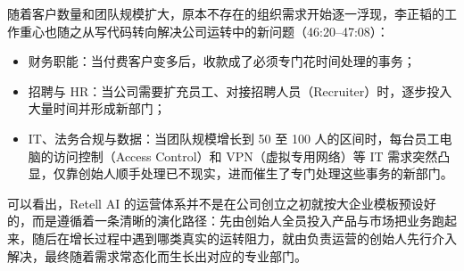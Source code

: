 \documentclass[UTF8,a4paper,11pt,fontset=fandol]{ctexart}
\begin{document}
随着客户数量和团队规模扩大，原本不存在的组织需求开始逐一浮现，李正韬的工作重心也随之从写代码转向解决公司运转中的新问题（46:20–47:08）：
\begin{itemize}
\item 财务职能：当付费客户变多后，收款成了必须专门花时间处理的事务；
\item 招聘与 HR：当公司需要扩充员工、对接招聘人员（Recruiter）时，逐步投入大量时间并形成新部门；
\item IT、法务合规与数据：当团队规模增长到 50 至 100 人的区间时，每台员工电脑的访问控制（Access Control）和 VPN（虚拟专用网络）等 IT 需求突然凸显，仅靠创始人顺手处理已不现实，进而催生了专门处理这些事务的新部门。
\end{itemize}

可以看出，Retell AI 的运营体系并不是在公司创立之初就按大企业模板预设好的，而是遵循着一条清晰的演化路径：先由创始人全员投入产品与市场把业务跑起来，随后在增长过程中遇到哪类真实的运转阻力，就由负责运营的创始人先行介入解决，最终随着需求常态化而生长出对应的专业部门。
\end{document}
